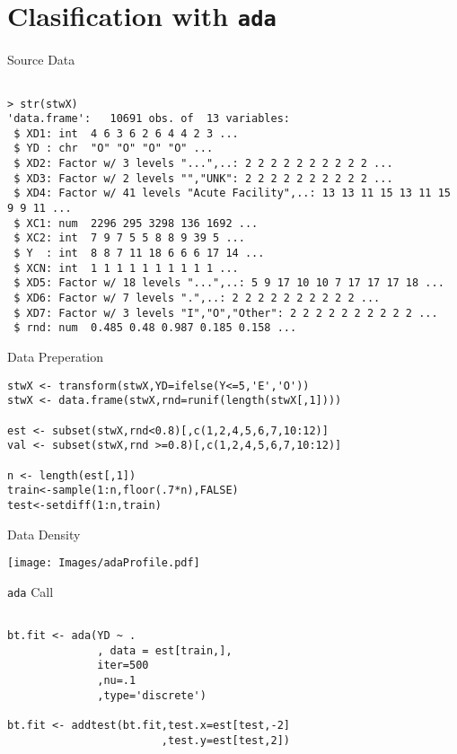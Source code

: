 \documentclass{beamer}
\begin{document}
\section{Clasification with \texttt{ada}}


\begin{frame}[fragile]{Source Data}
\scriptsize
\begin{verbatim}

> str(stwX)
'data.frame':	10691 obs. of  13 variables:
 $ XD1: int  4 6 3 6 2 6 4 4 2 3 ...
 $ YD : chr  "O" "O" "O" "O" ...
 $ XD2: Factor w/ 3 levels "...",..: 2 2 2 2 2 2 2 2 2 2 ...
 $ XD3: Factor w/ 2 levels "","UNK": 2 2 2 2 2 2 2 2 2 2 ...
 $ XD4: Factor w/ 41 levels "Acute Facility",..: 13 13 11 15 13 11 15 9 9 11 ...
 $ XC1: num  2296 295 3298 136 1692 ...
 $ XC2: int  7 9 7 5 5 8 8 9 39 5 ...
 $ Y  : int  8 8 7 11 18 6 6 6 17 14 ...
 $ XCN: int  1 1 1 1 1 1 1 1 1 1 ...
 $ XD5: Factor w/ 18 levels "...",..: 5 9 17 10 10 7 17 17 17 18 ...
 $ XD6: Factor w/ 7 levels ".",..: 2 2 2 2 2 2 2 2 2 2 ...
 $ XD7: Factor w/ 3 levels "I","O","Other": 2 2 2 2 2 2 2 2 2 2 ...
 $ rnd: num  0.485 0.48 0.987 0.185 0.158 ...
\end{verbatim}
\normalsize
\end{frame}


\begin{frame}[fragile]{Data Preperation}
\scriptsize
\begin{verbatim}
stwX <- transform(stwX,YD=ifelse(Y<=5,'E','O'))
stwX <- data.frame(stwX,rnd=runif(length(stwX[,1])))

est <- subset(stwX,rnd<0.8)[,c(1,2,4,5,6,7,10:12)]
val <- subset(stwX,rnd >=0.8)[,c(1,2,4,5,6,7,10:12)]

n <- length(est[,1])
train<-sample(1:n,floor(.7*n),FALSE)
test<-setdiff(1:n,train)
\end{verbatim}
\normalsize
\end{frame}

\begin{frame}[fragile]{Data Density}

\texttt{[image: Images/adaProfile.pdf]}
\end{frame}

\begin{frame}[fragile]{\texttt{ada} Call}
\scriptsize
\begin{verbatim}

bt.fit <- ada(YD ~ .
              , data = est[train,],
              iter=500
              ,nu=.1
              ,type='discrete')

bt.fit <- addtest(bt.fit,test.x=est[test,-2]
                        ,test.y=est[test,2])
\end{verbatim}
\normalsize
\end{frame}
\end{document}
